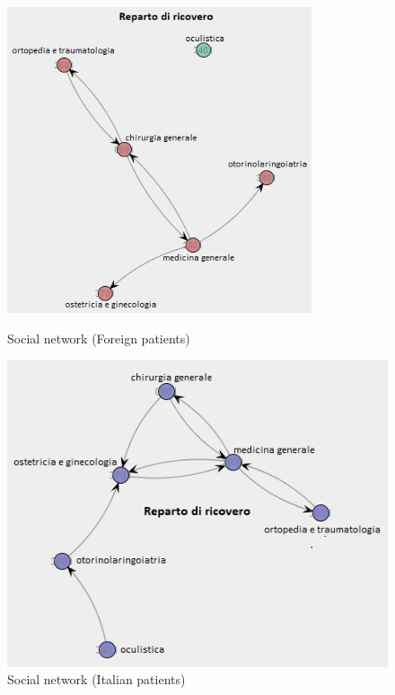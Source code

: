 \begin{figure} [htbp]
\begin{minipage}[t]{0.5\textwidth}
\includegraphics[width=0.8\textwidth , keepaspectratio]{RicoveriSocialNetworkForeigns}
\caption{Social network (Foreign patients)}
\end{minipage}
\begin{minipage}[t]{0.5\textwidth}
\includegraphics[width=\textwidth , keepaspectratio]{RicoveriSocialNetworkItalians}
\caption{Social network (Italian patients)}
\end{minipage}
\end{figure}
